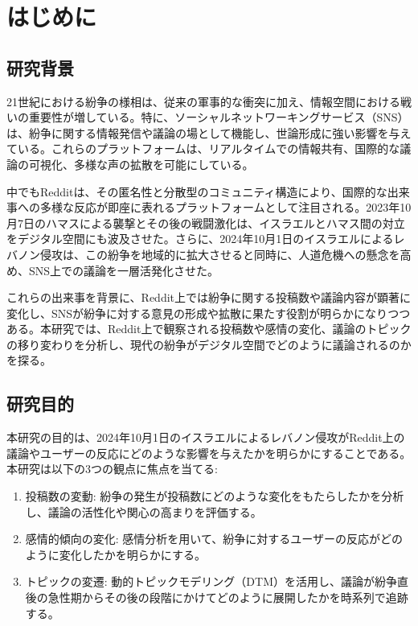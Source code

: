 \documentclass[11pt, a4j]{jreport}
\begin{document}
    \chapter{はじめに} %

    \section{研究背景} %
    21世紀における紛争の様相は、従来の軍事的な衝突に加え、情報空間における戦いの重要性が増している。特に、ソーシャルネットワーキングサービス（SNS）は、紛争に関する情報発信や議論の場として機能し、世論形成に強い影響を与えている。これらのプラットフォームは、リアルタイムでの情報共有、国際的な議論の可視化、多様な声の拡散を可能にしている。

    中でもRedditは、その匿名性と分散型のコミュニティ構造により、国際的な出来事への多様な反応が即座に表れるプラットフォームとして注目される。2023年10月7日のハマスによる襲撃とその後の戦闘激化は、イスラエルとハマス間の対立をデジタル空間にも波及させた。さらに、2024年10月1日のイスラエルによるレバノン侵攻は、この紛争を地域的に拡大させると同時に、人道危機への懸念を高め、SNS上での議論を一層活発化させた。

    これらの出来事を背景に、Reddit上では紛争に関する投稿数や議論内容が顕著に変化し、SNSが紛争に対する意見の形成や拡散に果たす役割が明らかになりつつある。本研究では、Reddit上で観察される投稿数や感情の変化、議論のトピックの移り変わりを分析し、現代の紛争がデジタル空間でどのように議論されるのかを探る。

    \section{研究目的}
    本研究の目的は、2024年10月1日のイスラエルによるレバノン侵攻がReddit上の議論やユーザーの反応にどのような影響を与えたかを明らかにすることである。本研究は以下の3つの観点に焦点を当てる: 

    \begin{enumerate}
        \item 投稿数の変動: 紛争の発生が投稿数にどのような変化をもたらしたかを分析し、議論の活性化や関心の高まりを評価する。
        \item 感情的傾向の変化: 感情分析を用いて、紛争に対するユーザーの反応がどのように変化したかを明らかにする。
        \item トピックの変遷: 動的トピックモデリング（DTM）を活用し、議論が紛争直後の急性期からその後の段階にかけてどのように展開したかを時系列で追跡する。
    \end{enumerate}
\end{document}
